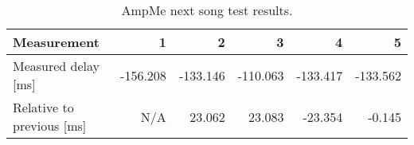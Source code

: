 \begin{table}[ht]
\centering
\begin{tabular}{|l|r|r|r|r|r|}
\hline
Measurement                 & 1         & 2        & 3        & 4        & 5         \\ \hline
Measured delay [ms]         & -156.208  & -133.146 & -110.063 & -133.417 & -133.562  \\ \hline
Relative to previous [ms]   & N/A       & 23.062   & 23.083   & -23.354   & -0.145    \\ \hline
\end{tabular}
\caption{AmpMe next song test results.}
\label{fig:ampmenextsongfigure}
\end{table}
